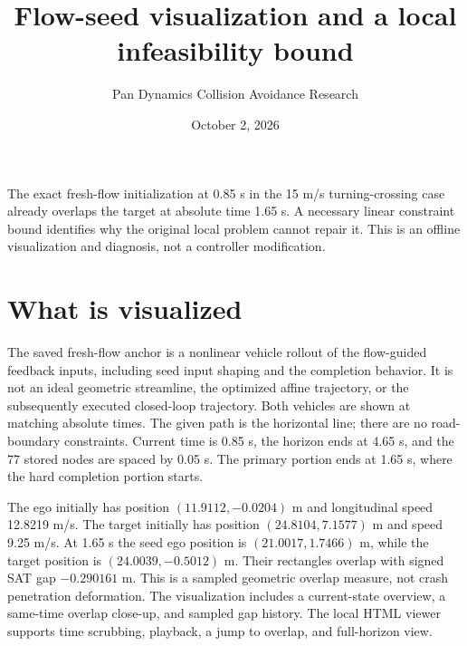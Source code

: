 \documentclass[11pt]{article}
\title{Flow-seed visualization and a local infeasibility bound}
\author{Pan Dynamics Collision Avoidance Research}
\date{October 2, 2026}
\begin{document}
\maketitle
The exact fresh-flow initialization at 0.85 s in the 15 m/s turning-crossing
case already overlaps the target at absolute time 1.65 s. A necessary linear
constraint bound identifies why the original local problem cannot repair it.
This is an offline visualization and diagnosis, not a controller modification.

\section{What is visualized}
The saved fresh-flow anchor is a nonlinear vehicle rollout of the flow-guided
feedback inputs, including seed input shaping and the completion behavior.
It is not an ideal geometric streamline, the optimized affine trajectory,
or the subsequently executed closed-loop trajectory. Both vehicles are shown
at matching absolute times. The given path is the horizontal line; there are
no road-boundary constraints. Current time is 0.85 s, the horizon ends at
4.65 s, and the 77 stored nodes are spaced by 0.05 s. The primary portion ends
at 1.65 s, where the hard completion portion starts.

The ego initially has position $(11.9112,-0.0204)$ m and longitudinal speed
12.8219 m/s. The target initially has position $(24.8104,7.1577)$ m and speed
9.25 m/s. At 1.65 s the seed ego position is $(21.0017,1.7466)$ m, while the
target position is $(24.0039,-0.5012)$ m. Their rectangles overlap with signed
SAT gap $-0.290161$ m. This is a sampled geometric overlap measure, not crash
penetration deformation. The visualization includes a current-state overview,
a same-time overlap close-up, and sampled gap history. The local HTML viewer
supports time scrubbing, playback, a jump to overlap, and full-horizon view.
\end{document}
